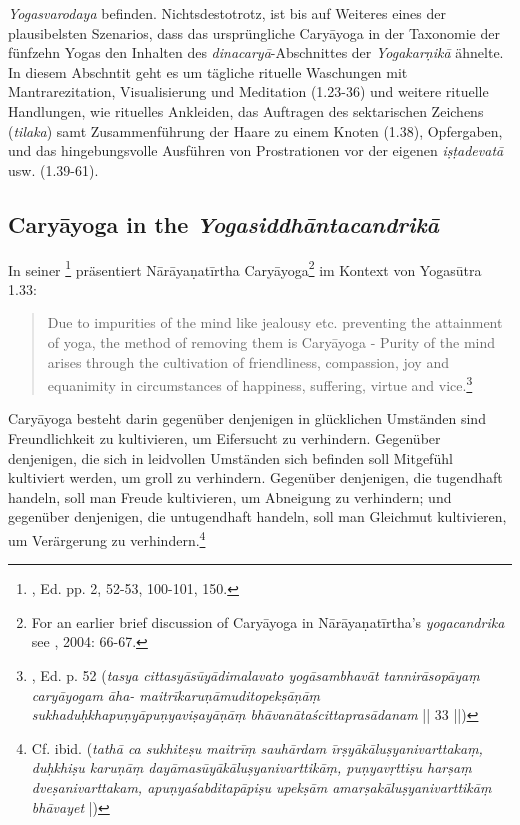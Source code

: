 \textit{Yogasvarodaya} befinden. Nichtsdestotrotz, ist bis auf Weiteres eines der plausibelsten Szenarios, dass das ursprüngliche Caryāyoga in der Taxonomie der fünfzehn Yogas den Inhalten des \textit{dinacaryā}-Abschnittes der \textit{Yogakarṇikā} ähnelte. In diesem Abschntit geht es um tägliche rituelle Waschungen mit Mantrarezitation, Visualisierung und Meditation (1.23-36) und weitere rituelle Handlungen, wie rituelles Ankleiden, das Auftragen des sektarischen Zeichens (\textit{tilaka}) samt Zusammenführung der Haare zu einem Knoten (1.38), Opfergaben, und das hingebungsvolle Ausführen von Prostrationen vor der eigenen \textit{iṣṭadevatā} usw. (1.39-61).               

\subsection{Caryāyoga in the \textit{Yogasiddhāntacandrikā}}

In seiner \footnote{, Ed. pp. 2, 52-53, 100-101, 150.} präsentiert Nārāyaṇatīrtha Caryāyoga\footnote{For an earlier brief discussion of Caryāyoga in Nārāyaṇatīrtha's \textit{yogacandrika} see \citeauthor{penna2004}, 2004: 66-67.} im Kontext von Yogasūtra 1.33:

\begin{quote}
  Due to impurities of the mind like jealousy etc. preventing the attainment of yoga, the method of removing them is Caryāyoga - Purity of the mind arises through the cultivation of friendliness, compassion, joy and equanimity in circumstances of happiness, suffering, virtue and vice.\footnote{, Ed. p. 52 (\textit{tasya cittasyāsūyādimalavato yogāsambhavāt tannirāsopāyaṃ caryāyogam āha- maitrīkaruṇāmuditopekṣāṇāṃ sukhaduḥkhapuṇyāpuṇyaviṣayāṇāṃ bhāvanātaścittaprasādanam} || 33 ||)} 
  \end{quote}
  
 Caryāyoga besteht darin gegenüber denjenigen in glücklichen Umständen sind Freundlichkeit zu kultivieren, um Eifersucht zu verhindern. Gegenüber denjenigen, die sich in leidvollen Umständen sich befinden soll Mitgefühl kultiviert werden, um groll zu verhindern. Gegenüber denjenigen, die tugendhaft handeln, soll man Freude kultivieren, um Abneigung zu verhindern; und gegenüber denjenigen, die untugendhaft handeln, soll man Gleichmut kultivieren, um Verärgerung zu verhindern.\footnote{Cf. ibid. (\textit{tathā ca sukhiteṣu maitrīṃ sauhārdam īrṣyākāluṣyanivarttakaṃ, duḥkhiṣu karuṇāṃ dayāmasūyākāluṣyanivarttikāṃ, puṇyavṛttiṣu harṣaṃ dveṣanivarttakam, apuṇyaśabditapāpiṣu upekṣām amarṣakāluṣyanivarttikāṃ bhāvayet} |)}        

